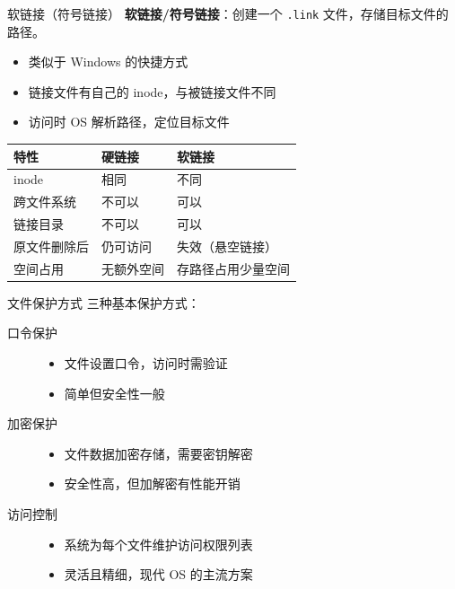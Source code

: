 \documentclass[10pt, aspectratio=169]{beamer}
\begin{document}
\begin{frame}{软链接（符号链接）}
    \textbf{软链接/符号链接}：创建一个 \texttt{.link} 文件，存储目标文件的路径。
    \vspace{0.5em}
    \begin{itemize}
        \item 类似于 Windows 的快捷方式
        \item 链接文件有自己的 inode，与被链接文件不同
        \item 访问时 OS 解析路径，定位目标文件
    \end{itemize}
    \vspace{0.5em}
    \begin{center}
        \begin{tabular}{|l|l|l|}
            \hline
            \textbf{特性} & \textbf{硬链接} & \textbf{软链接} \\
            \hline
            inode & 相同 & 不同 \\
            跨文件系统 & 不可以 & 可以 \\
            链接目录 & 不可以 & 可以 \\
            原文件删除后 & 仍可访问 & 失效（悬空链接） \\
            空间占用 & 无额外空间 & 存路径占用少量空间 \\
            \hline
        \end{tabular}
    \end{center}
\end{frame}

\begin{frame}{文件保护方式}
    三种基本保护方式：
    \vspace{0.5em}
    \begin{description}
        \item[口令保护]
            \begin{itemize}
                \item 文件设置口令，访问时需验证
                \item 简单但安全性一般
            \end{itemize}
        \item[加密保护]
            \begin{itemize}
                \item 文件数据加密存储，需要密钥解密
                \item 安全性高，但加解密有性能开销
            \end{itemize}
        \item[访问控制]
            \begin{itemize}
                \item 系统为每个文件维护访问权限列表
                \item 灵活且精细，现代 OS 的主流方案
            \end{itemize}
    \end{description}
\end{frame}
\end{document}
